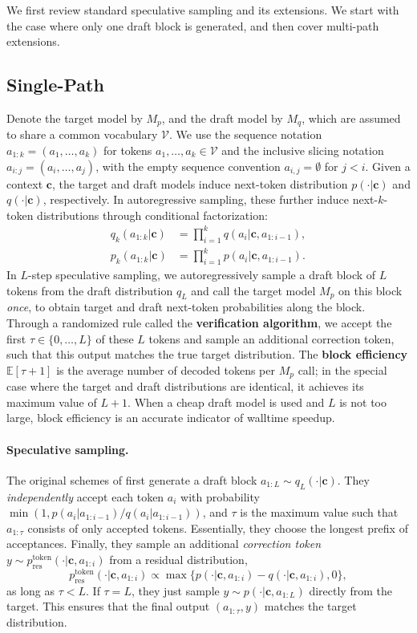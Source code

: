 \documentclass{article}
\theoremstyle{plain}
\theoremstyle{definition}
\theoremstyle{remark}
\newcommand{\V}{\mathcal{V}}
\newcommand{\con}{\boldsymbol{c}}
\newcommand{\ptokenres}{p_{\text{res}}^{\text{token}}}
\begin{document}
We first review standard speculative sampling and its extensions. We start with the case where only one draft block is generated, and then cover multi-path extensions.

\subsection{Single-Path}
Denote the target model by $M_p$, and the draft model by $M_q$, which are assumed to share a common vocabulary $\V$. We use the sequence notation $a_{1:k}=(a_1,\ldots,a_k)$ for tokens $a_1,\ldots,a_k \in \V$ and the inclusive slicing notation $a_{i:j} = (a_i,\ldots,a_j)$, with the empty sequence convention $a_{i,j}=\emptyset$ for $j<i$. Given a context $\con$, the target and draft models induce next-token distribution $p(\cdot|\con)$ and $q(\cdot|\con)$, respectively. In autoregressive sampling, these further induce next-$k$-token distributions through conditional factorization:
\begin{align}
    q_k(a_{1:k}|\con) &= \prod_{i=1}^k q(a_i|\con,a_{1:i-1}),\\ p_k(a_{1:k}|\con) &= \prod_{i=1}^k p(a_i|\con,a_{1:i-1}).
\end{align}
In $L$-step speculative sampling, we autoregressively sample a draft block of $L$ tokens from the draft distribution $q_L$ and call the target model $M_p$ on this block \emph{once}, to obtain target and draft next-token probabilities along the block. Through a randomized rule called the \textbf{verification algorithm}, we accept the first $\tau \in \{0,\ldots,L\}$ of these $L$ tokens and sample an additional correction token, such that this output matches the true target distribution. The \textbf{block efficiency} $\mathbb{E}[\tau+1]$ is the average number of decoded tokens per $M_p$ call; in the special case where the target and draft distributions are identical, it achieves its maximum value of $L+1$. When a cheap draft model is used and $L$ is not too large, block efficiency is an accurate indicator of walltime speedup.

\paragraph{Speculative sampling.} The original schemes of \citet{chen2023accelerating,leviathan2023fast} first generate a draft block $a_{1:L} \sim q_L(\cdot|\con)$. They \emph{independently} accept each token $a_i$ with probability $\min(1,p(a_i|a_{1:i-1})/q(a_i|a_{1:i-1}))$, and $\tau$ is the maximum value such that $a_{1:\tau}$ consists of only accepted tokens. Essentially, they choose the longest prefix of acceptances. Finally, they sample an additional \emph{correction token} $y \sim \ptokenres(\cdot|\con,a_{1:i})$ from a residual distribution,
\begin{equation}
    \ptokenres(\cdot|\con,a_{1:i}) \propto \max\{p(\cdot|\con,a_{1:i})-q(\cdot |\con,a_{1:i}),0\},
\end{equation}
as long as $\tau<L$. If $\tau=L$, they just sample $y \sim p(\cdot|\con,a_{1:L})$ directly from the target. This ensures that the final output $(a_{1:\tau},y)$ matches the target distribution. 
\end{document}
